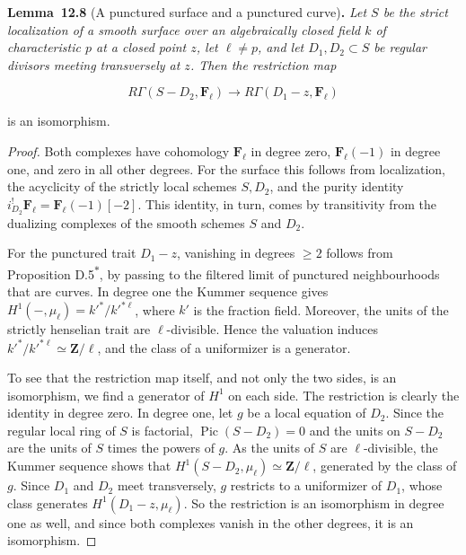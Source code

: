 \documentclass[11pt]{article}
\newenvironment{bpstatement}[2]{\par\addvspace{0.6\baselineskip}\noindent\textbf{#1}#2\textbf{.}\enspace\ignorespaces}
  {\par\addvspace{0.4\baselineskip}}
\newenvironment{bpstatementit}[2]{\begin{bpstatement}{#1}{#2}\itshape\ignorespaces}{\end{bpstatement}}
\newcommand{\bpout}[1]{#1\textsuperscript{\hyperlink{bp-outside}{\ensuremath{\ast}}}}
\begin{document}
\label{bp26}%
\begin{bpstatementit}{Lemma~12.8}{ (A punctured surface and a punctured curve)}
Let \(S\) be the strict localization of a smooth surface over an algebraically closed field \(k\) of characteristic \(p\) at a closed point \(z\), let \(\ell\neq p\), and let \(D_1,D_2\subset S\) be regular divisors meeting transversely at \(z\). Then the restriction map

\[
R\Gamma(S-D_2,\mathbf F_\ell)\longrightarrow R\Gamma(D_1-z,\mathbf F_\ell)
\]

is an isomorphism.
\end{bpstatementit}

\begin{proof}[{Proof}]\label{bp27}%
Both complexes have cohomology \(\mathbf F_\ell\) in degree zero, \(\mathbf F_\ell(-1)\) in degree one, and zero in all other degrees. For the surface this follows from localization, the acyclicity of the strictly local schemes \(S,D_2\), and the purity identity \(i_{D_2}^!\mathbf F_\ell=\mathbf F_\ell(-1)[-2]\). This identity, in turn, comes by transitivity from the dualizing complexes of the smooth schemes \(S\) and \(D_2\).

For the punctured trait \(D_1-z\), vanishing in degrees \(\geq2\) follows from Proposition \bpout{D.5}, by passing to the filtered limit of punctured neighbourhoods that are curves. In degree one the Kummer sequence gives \(H^1(-,\mu_\ell)=k'^*/k'^{*\ell}\), where \(k'\) is the fraction field. Moreover, the units of the strictly henselian trait are \(\ell\)-divisible. Hence the valuation induces \(k'^*/k'^{*\ell}\simeq\mathbf Z/\ell\), and the class of a uniformizer is a generator.

To see that the restriction map itself, and not only the two sides, is an isomorphism, we find a generator of \(H^1\) on each side. The restriction is clearly the identity in degree zero. In degree one, let \(g\) be a local equation of \(D_2\). Since the regular local ring of \(S\) is factorial, \(\operatorname{Pic}(S-D_2)=0\) and the units on \(S-D_2\) are the units of \(S\) times the powers of \(g\). As the units of \(S\) are \(\ell\)-divisible, the Kummer sequence shows that \(H^1(S-D_2,\mu_\ell)\simeq\mathbf Z/\ell\), generated by the class of \(g\). Since \(D_1\) and \(D_2\) meet transversely, \(g\) restricts to a uniformizer of \(D_1\), whose class generates \(H^1(D_1-z,\mu_\ell)\). So the restriction is an isomorphism in degree one as well, and since both complexes vanish in the other degrees, it is an isomorphism.
\end{proof}
\end{document}
